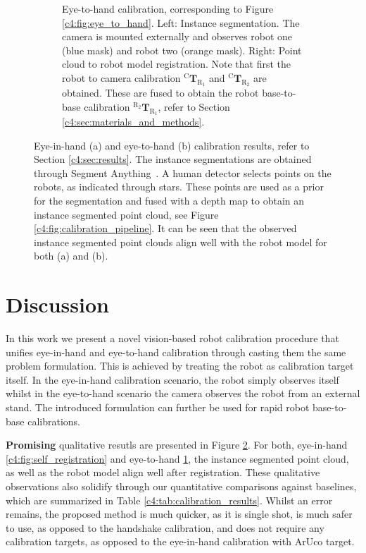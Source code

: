 \begin{figure}
\begin{subfigure}[b]{\textwidth}
         \caption{Eye-to-hand calibration, corresponding to Figure \ref{c4:fig:eye_to_hand}. Left: Instance segmentation. The camera is mounted externally and observes robot one (blue mask) and robot two (orange mask). Right: Point cloud to robot model registration. Note that first the robot to camera calibration $^\text{C}\mathbf{T}_{\text{R}_1}$ and $^\text{C}\mathbf{T}_{\text{R}_2}$ are obtained. These are fused to obtain the robot base-to-base calibration $^{\text{R}_2}\mathbf{T}_{\text{R}_1}$, refer to Section \ref{c4:sec:materials_and_methods}.}
         \label{c4:fig:double_registration}
     \end{subfigure}
     \caption{Eye-in-hand (a) and eye-to-hand (b) calibration results, refer to Section \ref{c4:sec:results}. The instance segmentations are obtained through Segment Anything~\citep{segment_anything}. A human detector selects points on the robots, as indicated through stars. These points are used as a prior for the segmentation and fused with a depth map to obtain an instance segmented point cloud, see Figure \ref{c4:fig:calibration_pipeline}. It can be seen that the observed instance segmented point clouds align well with the robot model for both (a) and (b).}
     \label{c4:fig:registration_results}
\end{figure}


\section{Discussion}%
In this work we present a novel vision-based robot calibration procedure that unifies eye-in-hand and eye-to-hand calibration through casting them the same problem formulation. This is achieved by treating the robot as calibration target itself. In the eye-in-hand calibration scenario, the robot simply observes itself whilst in the eye-to-hand scenario the camera observes the robot from an external stand. The introduced formulation can further be used for rapid robot base-to-base calibrations.

\textbf{Promising} qualitative resutls are presented in Figure \ref{c4:fig:registration_results}. For both, eye-in-hand \ref{c4:fig:self_registration} and eye-to-hand \ref{c4:fig:double_registration}, the instance segmented point cloud, as well as the robot model align well after registration. These qualitative observations also solidify through our quantitative comparisons against baselines, which are summarized in Table \ref{c4:tab:calibration_results}. Whilst an error remains, the proposed method is much quicker, as it is single shot, is much safer to use, as opposed to the handshake calibration, and does not require any calibration targets, as opposed to the eye-in-hand calibration with ArUco target.

